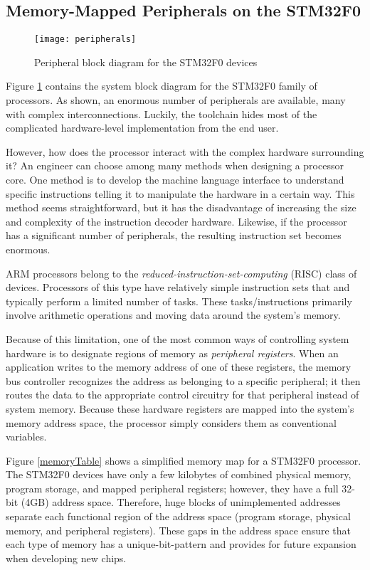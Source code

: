 \documentclass[openany,11pt,fleqn]{book} %
\begin{document}
\subsection{\color{orange}Memory-Mapped Peripherals on the STM32F0}

\begin{figure}[]
    \centering\texttt{[image: peripherals]}
    \caption{Peripheral block diagram for the STM32F0 devices}
    \label{peripherals}
\end{figure}

Figure \ref{peripherals} contains the system block diagram for the STM32F0 family of processors. As shown, an enormous number of peripherals are available, many with complex interconnections. Luckily, the toolchain hides most of the complicated hardware-level implementation from the end user.

However, how does the processor interact with the complex hardware surrounding it? An engineer can choose among many methods when designing a processor core. One method is to develop the machine language interface to understand specific instructions telling it to manipulate the hardware in a certain way. This method seems straightforward, but it has the disadvantage of increasing the size and complexity of the instruction decoder hardware. Likewise, if the processor has a significant number of peripherals, the resulting instruction set becomes enormous. 

ARM processors belong to the \textit{reduced-instruction-set-computing} (RISC) class of devices. Processors of this type have relatively simple instruction sets that and typically perform a limited number of tasks. These tasks/instructions primarily involve arithmetic operations and moving data around the system's memory.

Because of this limitation, one of the most common ways of controlling system hardware is to designate regions of memory as \textit{peripheral registers}. When an application writes to the memory address of one of these registers, the memory bus controller recognizes the address as belonging to a specific peripheral; it then routes the data to the appropriate control circuitry for that peripheral instead of system memory. Because these hardware registers are mapped into the system's memory address space, the processor simply considers them as conventional variables. 

Figure \ref{memoryTable} shows a simplified memory map for a STM32F0 processor. The STM32F0 devices have only a few kilobytes of combined physical memory, program storage, and mapped peripheral registers; however, they have a full 32-bit (4GB) address space. Therefore, huge blocks of unimplemented addresses separate each functional region of the address space (program storage, physical memory, and peripheral registers). These gaps in the address space ensure that each type of memory has a unique-bit-pattern and provides for future expansion when developing new chips. 
\end{document}
